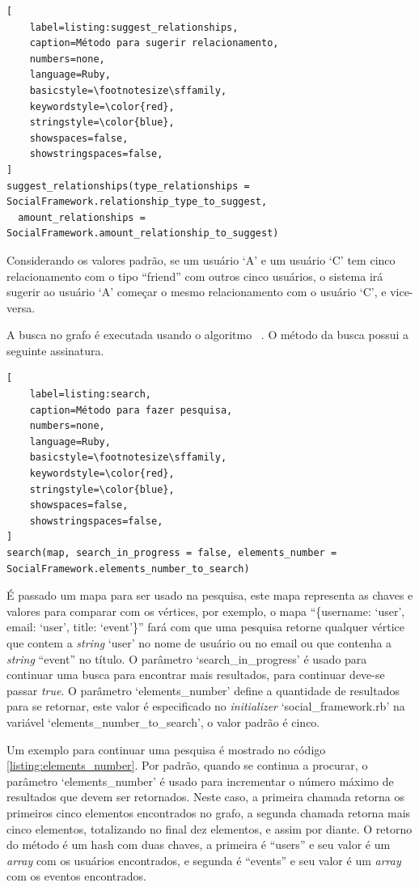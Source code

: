 \begin{lstlisting}[
    label=listing:suggest_relationships,
    caption=Método para sugerir relacionamento,
    numbers=none,
    language=Ruby,
    basicstyle=\footnotesize\sffamily,
    keywordstyle=\color{red},
    stringstyle=\color{blue},
    showspaces=false,
    showstringspaces=false,
]
suggest_relationships(type_relationships = SocialFramework.relationship_type_to_suggest,
  amount_relationships = SocialFramework.amount_relationship_to_suggest)
\end{lstlisting}

Considerando os valores padrão, se um usuário `A' e um usuário `C' tem cinco relacionamento com o tipo  ``friend'' com outros cinco usuários, o sistema irá sugerir ao usuário `A' começar o mesmo relacionamento com o usuário `C', e vice-versa.

A busca no grafo é executada usando o algoritmo ~. O método da busca possui a seguinte assinatura.

\begin{lstlisting}[
    label=listing:search,
    caption=Método para fazer pesquisa,
    numbers=none,
    language=Ruby,
    basicstyle=\footnotesize\sffamily,
    keywordstyle=\color{red},
    stringstyle=\color{blue},
    showspaces=false,
    showstringspaces=false,
]
search(map, search_in_progress = false, elements_number = SocialFramework.elements_number_to_search)
\end{lstlisting}

É passado um mapa para ser usado na pesquisa, este mapa representa as chaves e valores para comparar com os vértices, por exemplo, o mapa ``\{username: `user', email: `user', title: `event'\}'' fará com que uma pesquisa retorne qualquer vértice que contem a \textit{string} `user' no nome de usuário ou no email ou que contenha a \textit{string} ``event'' no título. O parâmetro `search\_in\_progress' é usado para continuar uma busca para encontrar mais resultados, para continuar deve-se passar \textit{true}. O parâmetro `elements\_number' define a quantidade de resultados para se retornar, este valor é especificado no \textit{initializer} `social\_framework.rb' na variável `elements\_number\_to\_search', o valor padrão é cinco.

Um exemplo para continuar uma pesquisa é mostrado no código \ref{listing:elements_number}. Por padrão, quando se continua a procurar, o parâmetro `elements\_number' é usado para incrementar o número máximo de resultados que devem ser retornados. Neste caso, a primeira chamada retorna os primeiros cinco elementos encontrados no grafo, a segunda chamada retorna mais cinco elementos, totalizando no final dez elementos, e assim por diante. O retorno do método é um hash com duas chaves, a primeira é ``users'' e seu valor é um \textit{array} com os usuários encontrados, e segunda é ``events'' e seu valor é um \textit{array} com os eventos encontrados.

